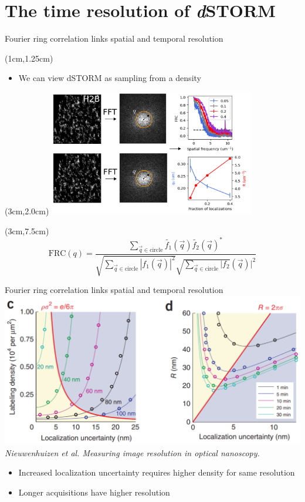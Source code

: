 \documentclass{beamer}					%
\begin{document}
\section{The time resolution of \textit{d}STORM}
\begin{frame}{Fourier ring correlation links spatial and temporal resolution}
\begin{textblock*}{13cm}(1cm,1.25cm)
\begin{itemize}
\item We can view dSTORM as sampling from a density
\end{itemize}
\end{textblock*}
\begin{textblock*}{9cm}(3cm,2.0cm)
\includegraphics[width=9cm]{FRC.png}
\end{textblock*}
\begin{textblock*}{8cm}(3cm,7.5cm)
\begin{equation*}
\mathrm{FRC}(q) = \frac{\sum_{\vec{q}\in\mathrm{circle}}\tilde{f_{1}}(\vec{q})\tilde{f_{2}}(\vec{q})^{*}}{\sqrt{\sum_{\vec{q}\in\mathrm{circle}}|f_{1}(\vec{q})|^{2}}\sqrt{\sum_{\vec{q}\in\mathrm{circle}}|f_{2}}(\vec{q})|^{2}}
\end{equation*}
\end{textblock*}
\end{frame}

\begin{frame}{Fourier ring correlation links spatial and temporal resolution}
\includegraphics[width=\textwidth]{Spatial.png}
\textit{Nieuwenhuizen et al. Measuring image resolution in optical nanoscopy.}\\
\begin{itemize}
\item Increased localization uncertainty requires higher density for same resolution
\item Longer acquisitions have higher resolution
\end{itemize}

\end{frame}
\end{document}
